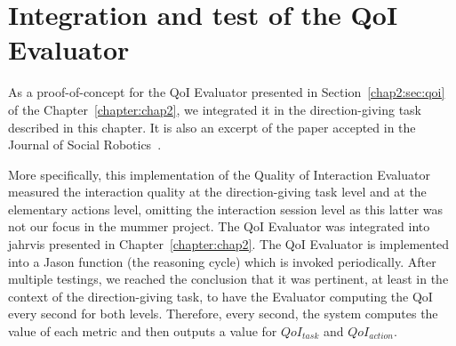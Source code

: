 \documentclass[a4paper,11pt,twoside]{StyleThese}
\begin{document}
\section{Integration and test of the QoI Evaluator}\label{sec:qoi_integration}
As a proof-of-concept for the QoI Evaluator presented in Section~\ref{chap2:sec:qoi} of the Chapter~\ref{chapter:chap2}, we integrated it in the direction-giving task described in this chapter. It is also an excerpt of the paper accepted in the Journal of Social Robotics~\cite{mayima_2021_towards}.

More specifically, this implementation of the Quality of Interaction Evaluator measured the interaction quality at the direction-giving task level and at the elementary actions level, omitting the interaction session level as this latter was not our focus in the \acrshort{mummer} project. The QoI Evaluator was integrated into \acrshort{jahrvis} presented in Chapter~\ref{chapter:chap2}. The QoI Evaluator is implemented into a Jason function (the reasoning cycle) which is invoked periodically. After multiple testings, we reached the conclusion that it was pertinent, at least in the context of the direction-giving task, to have the Evaluator computing the QoI every second for both levels. Therefore, every second, the system computes the value of each metric and then outputs a value for $QoI_{task}$ and $QoI_{action}$. 
\end{document}
